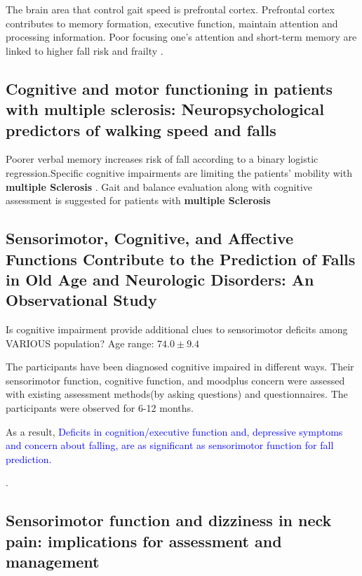 \documentclass{article}
\begin{document}
The brain area that control gait speed is prefrontal cortex. Prefrontal cortex contributes to memory formation, executive function, maintain attention and processing information. Poor focusing one's attention and short-term memory are linked to higher fall risk and frailty \cite{O_Halloran_2013}.

\subsection{Cognitive and motor functioning in patients with multiple sclerosis: Neuropsychological predictors of walking speed and falls}
Poorer verbal memory increases risk of fall according to a binary logistic regression.Specific cognitive impairments are limiting the patients' mobility with \textbf{multiple Sclerosis} . Gait and balance evaluation along with cognitive assessment is suggested for patients with \textbf{multiple Sclerosis} \cite{D_Orio_2012}
\subsection{Sensorimotor, Cognitive, and Affective Functions Contribute to the Prediction of Falls in Old Age and Neurologic Disorders: An Observational Study}

Is cognitive impairment provide additional clues to sensorimotor deficits among VARIOUS population? Age range: $74.0 \pm 9.4$

The participants have been diagnosed cognitive impaired in different ways. Their sensorimotor function, cognitive function, and moodplus concern were assessed with existing assessment methods(by asking questions) and questionnaires. The participants were observed for 6-12 months.

As a result, \textcolor{blue}{Deficits in cognition/executive function and, depressive symptoms and concern about falling, are as significant as sensorimotor function for fall prediction.}

\cite{van_Schooten_2020}.
\subsection{Sensorimotor function and dizziness in neck pain: implications for assessment and management}

\begin{comment}
\begin{description}[font=$\bullet$~\normalfont\textbf]
\item [Bananas] yellow and banana shaped
\item [Apples] red and round
\item [Oranges] orange and round
\item [Lemons] yellow, kinda round
\end{description}
\end{comment}
\end{document}
